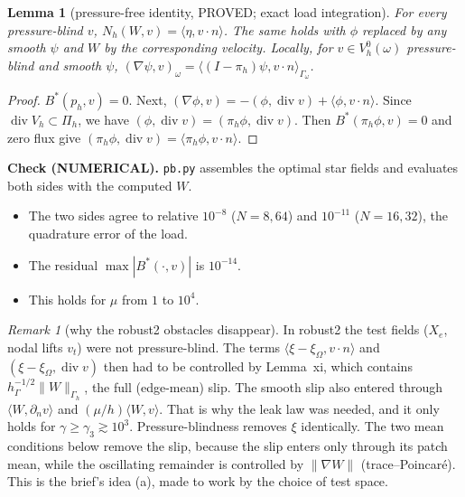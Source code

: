 \documentclass[11pt]{article}
\newtheorem{lemma}[theorem]{Lemma}
\theoremstyle{remark}
\newtheorem{remark}[theorem]{Remark}
\newcommand{\hG}{h_\Gamma}
\newcommand{\Gh}{\Gamma_h}
\newcommand{\ip}[2]{\langle #1,#2\rangle}
\begin{document}
\begin{lemma}[pressure-free identity, PROVED; exact load integration]\label{lem:pf}
For every pressure-blind $v$, $N_h(W,v)=\ip{\eta}{v\cdot n}$. The same holds with $\phi$ replaced by any smooth $\psi$ and $W$ by the
corresponding velocity. Locally, for $v\in V_h^0(\omega)$ pressure-blind and smooth $\psi$,
$(\nabla\psi,v)_\omega=\ip{(I-\pi_h)\psi}{v\cdot n}_{\Gamma_\omega}$.
\end{lemma}
\begin{proof}
$B^\ast(p_h,v)=0$. Next, $(\nabla\phi,v)=-(\phi,\operatorname{div}v)+\ip{\phi}{v\cdot n}$. Since
$\operatorname{div}V_h\subset\Pi_h$, we have $(\phi,\operatorname{div}v)=(\pi_h\phi,\operatorname{div}v)$. Then
$B^\ast(\pi_h\phi,v)=0$ and zero flux give $(\pi_h\phi,\operatorname{div}v)=\ip{\pi_h\phi}{v\cdot n}$.
\end{proof}
\noindent\textbf{Check (NUMERICAL).} \texttt{pb.py} assembles the optimal star fields and evaluates both sides with the computed $W$.
\begin{itemize}
\item The two sides agree to relative $10^{-8}$ ($N=8,64$) and $10^{-11}$ ($N=16,32$), the quadrature error of the load.
\item The residual $\max|B^\ast(\cdot,v)|$ is $10^{-14}$.
\item This holds for $\mu$ from $1$ to $10^4$.
\end{itemize}

\begin{remark}[why the robust2 obstacles disappear]
In robust2 the test fields ($X_e$, nodal lifts $v_t$) were not pressure-blind. The terms $\ip{\xi-\xi_\Omega}{v\cdot n}$ and
$(\xi-\xi_\Omega,\operatorname{div}v)$ then had to be controlled by Lemma~xi, which contains $\hG^{-1/2}\|W\|_{\Gh}$, the full
(edge-mean) slip. The smooth slip also entered through $\ip{W}{\partial_nv}$ and $(\mu/h)\ip{W}{v}$. That is why the leak law was
needed, and it only holds for $\gamma\ge\gamma_3\gtrsim10^3$. Pressure-blindness removes $\xi$ identically. The two mean
conditions below remove the slip, because the slip enters only through its patch mean, while the oscillating remainder is
controlled by $\|\nabla W\|$ (trace--Poincar\'e). This is the brief's idea (a), made to work by the choice of test space.
\end{remark}
\end{document}
